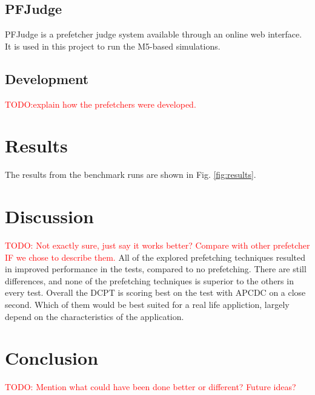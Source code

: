 \documentclass[a4paper]{IEEEtran}
\newcommand\TODO[1]{\textcolor{red}{TODO:#1}}
\newcommand\todo[1]{\TODO{#1}}
\begin{document}
\subsection{PFJudge}

PFJudge is a prefetcher judge system available through an online web interface.
It is used in this project to run the M5-based simulations.

\subsection{Development}

\todo{explain how the prefetchers were developed.}

\section{Results}

The results from the benchmark runs are shown in Fig. \ref{fig:results}.



\section{Discussion}

\todo{ Not exactly sure, just say it works better? Compare with other prefetcher IF we chose to describe them. }
All of the explored prefetching techniques resulted in improved performance in the tests, compared to no prefetching.
There are still differences, and none of the prefetching techniques is superior to the others in every test.
Overall the DCPT is scoring best on the test with APCDC on a close second.
Which of them would be best suited for a real life appliction, largely depend on the characteristics of the application.



\section{Conclusion}

\todo{ Mention what could have been done better or different? Future ideas? }



\nocite{*}
\end{document}
